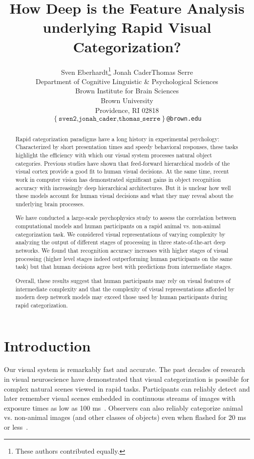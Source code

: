 \documentclass{article}
\title{How Deep is the Feature Analysis underlying Rapid Visual Categorization?}
\date{}
\author{
  Sven Eberhardt\thanks{These authors contributed equally.}  \hfill Jonah Cader\samethanks \hfill Thomas Serre\\
  Department of Cognitive Linguistic \& Psychological Sciences \\
  Brown Institute for Brain Sciences\\
  Brown University \\
  Providence, RI 02818 \\
  \texttt{$\left\{\mathrm{\texttt{sven2,jonah\_cader,thomas\_serre}}\right\}$@brown.edu}
}
\begin{document}
\maketitle


\begin{abstract}
  Rapid categorization paradigms have a long history in experimental psychology: Characterized by short presentation times and speedy behavioral responses, these tasks highlight the efficiency with which our visual system processes natural object categories. Previous studies have shown that feed-forward hierarchical models of the visual cortex provide a good fit to human visual decisions. At the same time, recent work in computer vision has demonstrated significant gains in object recognition accuracy with increasingly deep hierarchical architectures. But it is unclear how well these models account for human visual decisions and what they may reveal about the underlying brain processes.
  
  We have conducted a large-scale psychophysics study to assess the correlation between computational models and human participants on a rapid animal vs. non-animal categorization task. We considered visual representations of varying complexity by analyzing the output of different stages of processing in three state-of-the-art deep networks. We found that recognition accuracy increases with higher stages of visual processing (higher level stages indeed outperforming human participants on the same task) but that human decisions agree best with predictions from intermediate stages. 
  
  Overall, these results suggest that human participants may rely on visual features of intermediate complexity and that the complexity of visual representations afforded by modern deep network models may exceed those used by human participants during rapid categorization.\vspace{1cm}
\end{abstract}






\section{Introduction}


Our visual system is remarkably fast and accurate. The past decades of research in visual neuroscience have demonstrated that visual categorization is possible for complex natural scenes viewed in rapid tasks. Participants can reliably detect and later remember visual scenes embedded in continuous streams of images with exposure times as low as 100 ms~\citep[see][for review]{Potter2012}. Observers can also reliably categorize animal vs. non-animal images (and other classes of objects) even when flashed for 20 ms or less~\citep[see][for review]{Fabre-Thorpe2011}. 
\end{document}
